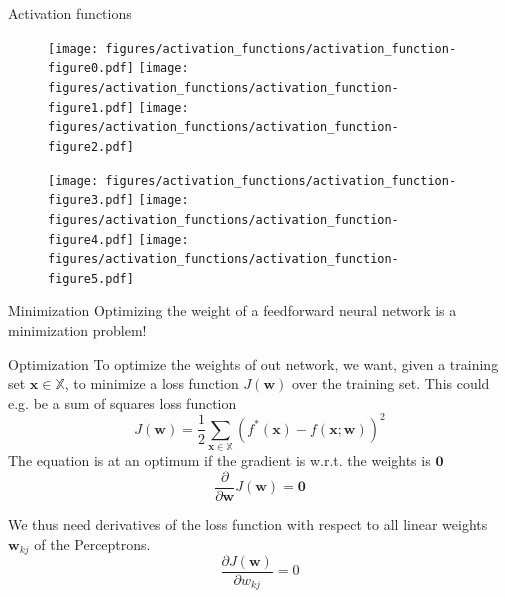 \documentclass[]{beamer}
\begin{document}
\begin{frame}
   {Activation functions}
   \begin{figure}
      \texttt{[image: figures/activation\_functions/activation\_function-figure0.pdf]}
      \hspace{0.1cm}
      \texttt{[image: figures/activation\_functions/activation\_function-figure1.pdf]}
      \hspace{0.1cm}
      \texttt{[image: figures/activation\_functions/activation\_function-figure2.pdf]}
   \end{figure}
   \begin{figure}
      \texttt{[image: figures/activation\_functions/activation\_function-figure3.pdf]}
      \hspace{0.1cm}
      \texttt{[image: figures/activation\_functions/activation\_function-figure4.pdf]}
      \hspace{0.1cm}
      \texttt{[image: figures/activation\_functions/activation\_function-figure5.pdf]}
   \end{figure}
\end{frame}


\begin{frame}
   {Minimization}
   \scriptsize
   Optimizing the weight of a feedforward neural network is a minimization problem!
   \begin{block}
      {Optimization}
      To optimize the weights of out network, we want, given a training set $\boldsymbol{x} \in \mathbb{X}$, to minimize a loss function $J \left( \boldsymbol{w} \right)$ over the training set. This could e.g. be a sum of squares loss function
      \begin{equation*}
         J \left( \boldsymbol{w} \right) = \frac{1}{2} \sum_{\boldsymbol{x} \in \mathbb{X}} \left( f^*\left(\boldsymbol{x}\right) - f \left(\boldsymbol{x}; \boldsymbol{w} \right) \right)^2
      \end{equation*}
      The equation is at an optimum if the gradient is w.r.t. the weights is $\boldsymbol{0}$
      \begin{equation*}
         \frac{\partial }{\partial \boldsymbol{w}} J \left( \boldsymbol{w} \right) 
            = \boldsymbol{0}
      \end{equation*}
   \end{block}
   
   \vspace{0.5cm}
   We thus need derivatives of the loss function with respect to all linear weights $\boldsymbol{w}_{kj}$ of the Perceptrons.
   \begin{equation*} 
      \frac{\partial J \left( \boldsymbol{w} \right)}{\partial w_{kj}} = 0
   \end{equation*}
\end{frame}
\end{document}
